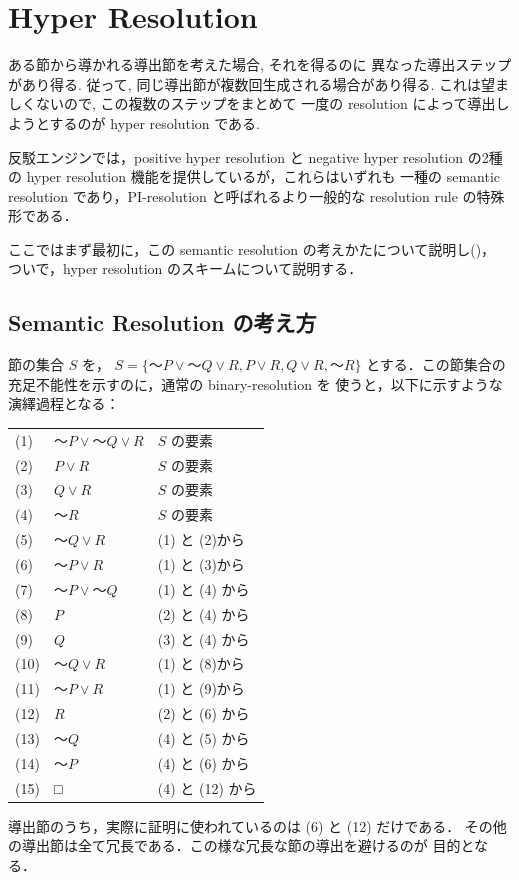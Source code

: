 \section{Hyper Resolution}
\label{sec:hyper-res}
\label{sec:neg-hyper-res}

ある節から導かれる導出節を考えた場合, それを得るのに
異なった導出ステップがあり得る. 
従って, 同じ導出節が複数回生成される場合があり得る.
これは望ましくないので, この複数のステップをまとめて
一度の resolution によって導出しようとするのが hyper resolution
である.

反駁エンジンでは，positive hyper resolution と negative hyper resolution
の2種の hyper resolution 機能を提供しているが，これらはいずれも
一種の semantic resolution であり，PI-resolution と呼ばれるより一般的な
resolution rule の特殊形である．

ここではまず最初に，この semantic resolution の考えかたについて説明し(\cite{chang-lee})，
ついで，hyper resolution のスキームについて説明する．

\subsection{Semantic Resolution の考え方}\cite{chang-lee}

節の集合 $S$ を，
$S = \{〜P \lor 〜Q \lor R, P\lor R, Q\lor R, 〜R\}$
とする．この節集合の充足不能性を示すのに，通常の binary-resolution を
使うと，以下に示すような演繹過程となる：

\begin{center}
{\small
\begin{tabular}{lll}
(1) & $〜P \lor 〜Q \lor R$ & $S$ の要素 \\
(2) & $P\lor R$ & $S$ の要素 \\
(3) & $Q\lor R$ & $S$ の要素 \\
(4) & $〜R$  & $S$ の要素 \\
(5) & $〜Q\lor R$ & (1) と (2)から\\
(6) & $〜P\lor R$ & (1) と (3)から \\
(7) & $〜P\lor 〜Q$ & (1) と (4) から\\
(8) & $P$ & (2) と (4) から \\
(9) & $Q$ & (3) と (4) から \\
(10) & $〜Q\lor R$ & (1) と (8)から \\
(11) & $〜P\lor R$ & (1) と (9)から \\
(12) & $R$ & (2) と (6) から \\
(13) & $〜Q$ & (4) と (5) から \\
(14) & $〜P$ & (4) と (6) から \\
(15) & □ & (4) と (12) から \\
\end{tabular}
}
\end{center}
導出節のうち，実際に証明に使われているのは (6) と (12) だけである．
その他の導出節は全て冗長である．この様な冗長な節の導出を避けるのが
目的となる．

